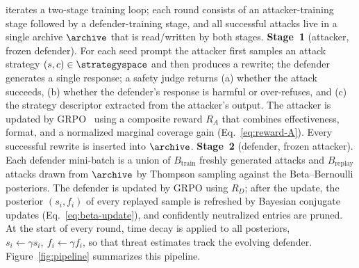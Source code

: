 \method iterates a two-stage training loop; each round consists of an attacker-training stage followed by a defender-training stage, and all successful attacks live in a single archive $\archive$ that is read/written by both stages. \textbf{Stage~1} (attacker, frozen defender). For each seed prompt the attacker first samples an attack strategy $(s,c)\in\strategyspace$ and then produces a rewrite; the defender generates a single response; a safety judge returns (a) whether the attack succeeds, (b) whether the defender's response is harmful or over-refuses, and (c) the strategy descriptor extracted from the attacker's output. The attacker is updated by GRPO~\citep{shao2024grpo} using a composite reward $R_A$ that combines effectiveness, format, and a normalized marginal coverage gain (Eq.~\ref{eq:reward-A}). Every successful rewrite is inserted into $\archive$. \textbf{Stage~2} (defender, frozen attacker). Each defender mini-batch is a union of $B_{\mathrm{train}}$ freshly generated attacks and $B_{\mathrm{replay}}$ attacks drawn from $\archive$ by Thompson sampling against the Beta--Bernoulli posteriors. The defender is updated by GRPO using $R_D$; after the update, the posterior $(s_i,f_i)$ of every replayed sample is refreshed by Bayesian conjugate updates (Eq.~\ref{eq:beta-update}), and confidently neutralized entries are pruned. At the start of every round, time decay is applied to all posteriors, $s_i\leftarrow\gamma s_i,\ f_i\leftarrow\gamma f_i$, so that threat estimates track the evolving defender. Figure~\ref{fig:pipeline} summarizes this pipeline.

